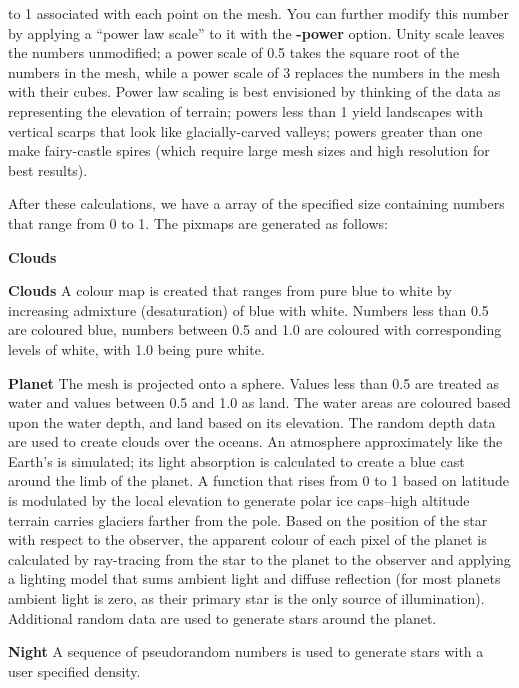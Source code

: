 to 1 associated with each point on the mesh.  You can further
modify this number by applying a ``power law scale'' to it with the
{\bf -power}
option.   Unity scale
leaves the numbers unmodified; a power scale of 0.5 takes the square
root of the numbers in the mesh, while a power scale of 3 replaces the
numbers in the mesh with their cubes.  Power law scaling is best
envisioned by thinking of the data as representing the elevation of
terrain; powers less than 1 yield landscapes with vertical scarps that
look like glacially-carved valleys; powers greater than one make
fairy-castle spires (which require large mesh sizes and high
resolution for best results).
\par
After these calculations, we have a array of the specified size
containing numbers that range from 0 to 1.  The pixmaps are generated as
follows:
\begin{TPlist}{{\bf Clouds}}
\item[{{\bf Clouds}}]
A colour map is created that ranges from pure blue to white by
increasing admixture (desaturation) of blue with white.  Numbers less
than 0.5 are coloured blue, numbers between 0.5 and 1.0 are coloured
with corresponding levels of white, with 1.0 being pure white.
\item[{{\bf Planet}}]
The mesh is projected onto a sphere.  Values less than 0.5 are treated
as water and values between 0.5 and 1.0 as land.  The water areas are
coloured based upon the water depth, and land based on its elevation.
The random depth data are used to create clouds over the oceans.  An
atmosphere approximately like the Earth's is simulated; its light
absorption is calculated to create a blue cast around the limb of the
planet.  A function that rises from 0 to 1 based on latitude is
modulated by the local elevation to generate polar ice caps--high
altitude terrain carries glaciers farther from the pole.  Based on the
position of the star with respect to the observer, the apparent colour
of each pixel of the planet is calculated by ray-tracing from the star
to the planet to the observer and applying a lighting model that sums
ambient light and diffuse reflection (for most planets ambient light
is zero, as their primary star is the only source of illumination).
Additional random data are used to generate stars around the planet.
\item[{{\bf Night}}]
A sequence of pseudorandom numbers is used to generate stars with a
user specified density.
\end{TPlist}

